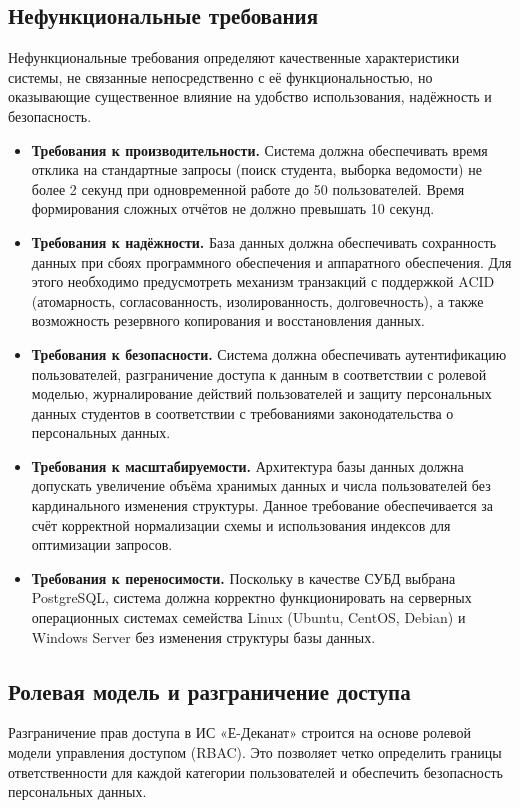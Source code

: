 \documentclass[14pt, a4paper]{extreport}
\begin{document}
\subsection{Нефункциональные требования}
Нефункциональные требования определяют качественные характеристики системы, не связанные непосредственно с её функциональностью, но оказывающие существенное влияние на удобство использования, надёжность и безопасность.
\begin{itemize}
    \item \textbf{Требования к производительности.} Система должна обеспечивать время отклика на стандартные запросы (поиск студента, выборка ведомости) не более 2 секунд при одновременной работе до 50 пользователей. Время формирования сложных отчётов не должно превышать 10 секунд.
    \item \textbf{Требования к надёжности.} База данных должна обеспечивать сохранность данных при сбоях программного обеспечения и аппаратного обеспечения. Для этого необходимо предусмотреть механизм транзакций с поддержкой ACID (атомарность, согласованность, изолированность, долговечность), а также возможность резервного копирования и восстановления данных.
    \item \textbf{Требования к безопасности.} Система должна обеспечивать аутентификацию пользователей, разграничение доступа к данным в соответствии с ролевой моделью, журналирование действий пользователей и защиту персональных данных студентов в соответствии с требованиями законодательства о персональных данных.
    \item \textbf{Требования к масштабируемости.} Архитектура базы данных должна допускать увеличение объёма хранимых данных и числа пользователей без кардинального изменения структуры. Данное требование обеспечивается за счёт корректной нормализации схемы и использования индексов для оптимизации запросов.
    \item \textbf{Требования к переносимости.} Поскольку в качестве СУБД выбрана PostgreSQL, система должна корректно функционировать на серверных операционных системах семейства Linux (Ubuntu, CentOS, Debian) и Windows Server без изменения структуры базы данных.
\end{itemize}

\subsection{Ролевая модель и разграничение доступа}
Разграничение прав доступа в ИС «Е-Деканат» строится на основе ролевой модели управления доступом (RBAC). Это позволяет четко определить границы ответственности для каждой категории пользователей и обеспечить безопасность персональных данных.
\end{document}
